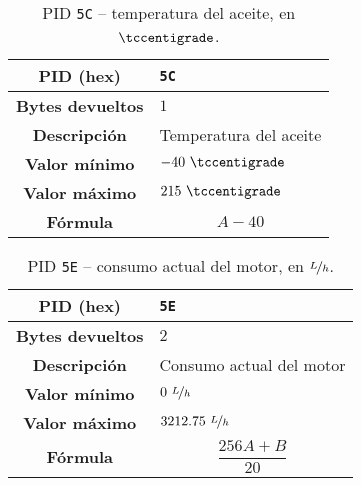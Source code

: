 \begin{table}[H]
  \centering
  \begin{tabularx}{\textwidth}{|c|X|}
    \hline
    \textbf{PID (hex)}       & \texttt{5C}            \\
    \hline
    \textbf{Bytes devueltos} & $1$                    \\
    \hline
    \textbf{Descripción}     & Temperatura del aceite \\
    \hline
    \textbf{Valor mínimo}    & $-40~\tccentigrade$    \\
    \hline
    \textbf{Valor máximo}    & $215~\tccentigrade$    \\
    \hline
    \textbf{Fórmula}         &                        %
    \begin{equation*}
      A - 40
    \end{equation*}                        \\
    \hline
  \end{tabularx}
  \caption{\ac{PID} \texttt{5C} -- temperatura del aceite, en $\tccentigrade$.}
\end{table}

\begin{table}[H]
  \centering
  \begin{tabularx}{\textwidth}{|c|X|}
    \hline
    \textbf{PID (hex)}       & \texttt{5E}               \\
    \hline
    \textbf{Bytes devueltos} & $2$                       \\
    \hline
    \textbf{Descripción}     & Consumo actual del motor  \\
    \hline
    \textbf{Valor mínimo}    & $0~\nicefrac{L}{h}$       \\
    \hline
    \textbf{Valor máximo}    & $3212.75~\nicefrac{L}{h}$ \\
    \hline
    \textbf{Fórmula}         &                           %
    \begin{equation*}
      \frac{256A + B}{20}
    \end{equation*}                           \\
    \hline
  \end{tabularx}
  \caption{\ac{PID} \texttt{5E} -- consumo actual del motor, en $\nicefrac{L}{h}$.}
\end{table}

